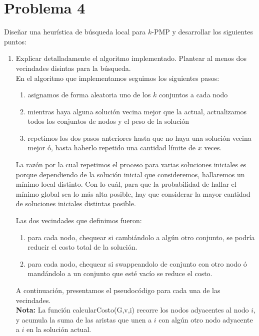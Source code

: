 \documentclass[11pt, a4paper, twoside]{article}
\begin{document}


\newpage
\section{Problema 4} 
	
	Diseñar una heurística de búsqueda local para $k$-PMP y desarrollar los siguientes puntos:
    \begin{enumerate}
    
		\item Explicar detalladamente el algoritmo implementado. Plantear al menos dos vecindades disintas
		para la búsqueda. \\
		En el algoritmo que implementamos seguimos los siguientes pasos:
		\begin{enumerate}
			\item asignamos de forma aleatoria uno de los $k$ conjuntos a cada nodo
			\item mientras haya alguna solución vecina mejor que la actual, actualizamos todos los
			      conjuntos de nodos y el peso de la solución
			\item repetimos los dos pasos anteriores hasta que no haya una solución vecina mejor ó, hasta
			      haberlo repetido una cantidad límite de $x$ veces.
		\end{enumerate}
		
		La razón por la cual repetimos el proceso para varias soluciones iniciales es porque dependiendo
		de la solución inicial que consideremos, hallaremos un mínimo local distinto. Con lo cuál, para
		que la probabilidad de hallar el mínimo global sea lo más alta posible, hay que considerar 
		la mayor cantidad de soluciones iniciales distintas posible.
		
		Las dos vecindades que definimos fueron:
		\begin{enumerate}
			\item para cada nodo, chequear si cambiándolo a algún otro conjunto, se podría reducir el costo
			      total de la solución.
			\item para cada nodo, chequear si swappeandolo de conjunto con otro nodo ó mandándolo a un conjunto que esté
			      vacío se reduce el costo.
		\end{enumerate}
		
		A continuación, presentamos el pseudocódigo para cada una de las vecindades. \\
		\textbf{Nota: } La función calcularCosto(G,v,i) recorre los nodos adyacentes al nodo $i$, y acumula la suma
	         		    de las aristas que unen a $i$ con algún otro nodo adyacente a $i$ en la solución actual.
      \begin{algorithm}[H]
			  

\end{algorithm}
\end{enumerate}
\end{document}
